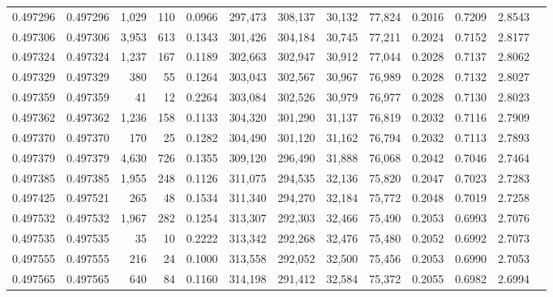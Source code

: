 \begin{tabular}{rrrrrrrrrrrrr}
0.497296 & 0.497296 & 1,029 &   110 &                                     0.0966 & 297,473 & 308,137 &  30,132 &  77,824 & 0.2016 & 0.7209 & 2.8543 \\
0.497306 & 0.497306 & 3,953 &   613 &                                     0.1343 & 301,426 & 304,184 &  30,745 &  77,211 & 0.2024 & 0.7152 & 2.8177 \\
0.497324 & 0.497324 & 1,237 &   167 &                                     0.1189 & 302,663 & 302,947 &  30,912 &  77,044 & 0.2028 & 0.7137 & 2.8062 \\
0.497329 & 0.497329 &   380 &    55 &                                     0.1264 & 303,043 & 302,567 &  30,967 &  76,989 & 0.2028 & 0.7132 & 2.8027 \\
0.497359 & 0.497359 &    41 &    12 &                                     0.2264 & 303,084 & 302,526 &  30,979 &  76,977 & 0.2028 & 0.7130 & 2.8023 \\
0.497362 & 0.497362 & 1,236 &   158 &                                     0.1133 & 304,320 & 301,290 &  31,137 &  76,819 & 0.2032 & 0.7116 & 2.7909 \\
0.497370 & 0.497370 &   170 &    25 &                                     0.1282 & 304,490 & 301,120 &  31,162 &  76,794 & 0.2032 & 0.7113 & 2.7893 \\
0.497379 & 0.497379 & 4,630 &   726 &                                     0.1355 & 309,120 & 296,490 &  31,888 &  76,068 & 0.2042 & 0.7046 & 2.7464 \\
0.497385 & 0.497385 & 1,955 &   248 &                                     0.1126 & 311,075 & 294,535 &  32,136 &  75,820 & 0.2047 & 0.7023 & 2.7283 \\
0.497425 & 0.497521 &   265 &    48 &                                     0.1534 & 311,340 & 294,270 &  32,184 &  75,772 & 0.2048 & 0.7019 & 2.7258 \\
0.497532 & 0.497532 & 1,967 &   282 &                                     0.1254 & 313,307 & 292,303 &  32,466 &  75,490 & 0.2053 & 0.6993 & 2.7076 \\
0.497535 & 0.497535 &    35 &    10 &                                     0.2222 & 313,342 & 292,268 &  32,476 &  75,480 & 0.2052 & 0.6992 & 2.7073 \\
0.497555 & 0.497555 &   216 &    24 &                                     0.1000 & 313,558 & 292,052 &  32,500 &  75,456 & 0.2053 & 0.6990 & 2.7053 \\
0.497565 & 0.497565 &   640 &    84 &                                     0.1160 & 314,198 & 291,412 &  32,584 &  75,372 & 0.2055 & 0.6982 & 2.6994 \\

\end{tabular}
